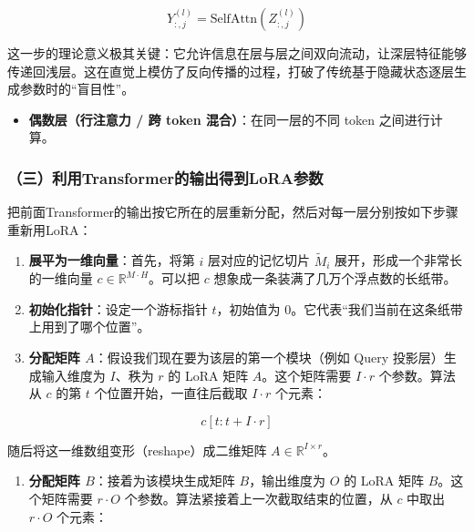 \[
Y_{:,j}^{(l)}=\mathrm{SelfAttn}(Z_{:,j}^{(l)})
\]

这一步的理论意义极其关键：它允许信息在层与层之间双向流动，让深层特征能够传递回浅层。这在直觉上模仿了反向传播的过程，打破了传统基于隐藏状态逐层生成参数时的``盲目性''。

\begin{itemize}
\tightlist
\item
  \textbf{偶数层（行注意力 / 跨 token 混合）}：在同一层的不同 token 之间进行计算。
\end{itemize}

\hypertarget{ux4e09ux5229ux7528transformerux7684ux8f93ux51faux5f97ux5230loraux53c2ux6570}{%
\subsubsection{（三）利用Transformer的输出得到LoRA参数}\label{ux4e09ux5229ux7528transformerux7684ux8f93ux51faux5f97ux5230loraux53c2ux6570}}

把前面Transformer的输出按它所在的层重新分配，然后对每一层分别按如下步骤重新用LoRA：

\begin{enumerate}
\def\labelenumi{\arabic{enumi}.}
\tightlist
\item
  \textbf{展平为一维向量}：首先，将第 \(i\) 层对应的记忆切片 \(\tilde{M}_i\) 展开，形成一个非常长的一维向量 \(c\in\mathbb{R}^{M\cdot H}\)。可以把 \(c\) 想象成一条装满了几万个浮点数的长纸带。
\item
  \textbf{初始化指针}：设定一个游标指针 \(t\)，初始值为 \(0\)。它代表``我们当前在这条纸带上用到了哪个位置''。
\item
  \textbf{分配矩阵 \(A\)}：假设我们现在要为该层的第一个模块（例如 Query 投影层）生成输入维度为 \(I\)、秩为 \(r\) 的 LoRA 矩阵 \(A\)。这个矩阵需要 \(I\cdot r\) 个参数。算法从 \(c\) 的第 \(t\) 个位置开始，一直往后截取 \(I\cdot r\) 个元素：
\end{enumerate}

\[
c[t:t+I\cdot r]
\]

随后将这一维数组变形（reshape）成二维矩阵 \(A\in\mathbb{R}^{I\times r}\)。

\begin{enumerate}
\def\labelenumi{\arabic{enumi}.}
\setcounter{enumi}{3}
\tightlist
\item
  \textbf{分配矩阵 \(B\)}：接着为该模块生成矩阵 \(B\)，输出维度为 \(O\) 的 LoRA 矩阵 \(B\)。这个矩阵需要 \(r\cdot O\) 个参数。算法紧接着上一次截取结束的位置，从 \(c\) 中取出 \(r\cdot O\) 个元素：
\end{enumerate}


